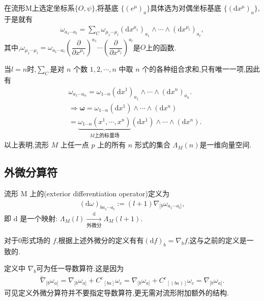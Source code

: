 在流形M上选定坐标系$\{O,\psi\}$,将基底 $\{(e^\mu)_a\}$具体选为对偶坐标基底 $\{(\mathrm{d}x^\mu)_a\}$,于是就有
\begin{align}
\displaystyle\omega_{a_1\cdots a_l}=\sum\limits_C\omega_{\mu_1\cdots\mu_l}
(\text{d}x^{\mu_1})_{a_1}\wedge\cdots\wedge(\text{d}x^{\mu_l})_{a_l},
\end{align}
其中,$\omega_{\mu_1\cdots\mu_l}=\omega_{a_1\cdots a_l}\left(\dfrac{\partial}{\partial x^{\mu_1}}\right)^{a_1}\cdots\left(\dfrac{\partial}{\partial x^{\mu_l}}\right)^{a_l}$是$O$上的函数.
\begin{remark}
当$l=n$时,$\sum\limits_C$是对 $n$ 个数 $1,2,\cdots,n$ 中取 $n$ 个的各种组合求和,只有唯一一项,因此有
$$
\begin{aligned}
&\omega_{a_1\cdots a_n}=\omega_{1\cdots n}(\text{d}x^{1})_{a_1}\wedge\cdots\wedge(\text{d}x^{n})_{a_n}.\\
&\Rightarrow \boldsymbol{\omega}=\omega_{1\cdots n}(\text{d}x^{1})\wedge\cdots\wedge(\text{d}x^{n})\\
&=\underset{M\text{上的标量场}}{\underbrace{\omega_{1\cdots n}(x^1,\cdots,x^n)}}(\text{d}x^{1})\wedge\cdots\wedge(\text{d}x^{n}).
\end{aligned}$$
以上表明,流形 $M$ 上任一点 $p$ 上的所有 $n$ 形式的集合 $\Lambda_M(n)$是一维向量空间.
\end{remark}
\subsection{外微分算符}

流形 M 上的(exterior differentiation operator)定义为
\begin{align}
(\mathrm{d}\omega)_{ba_1\cdots a_l}:=(l+1)\nabla_{[b}\omega_{a_1\cdots a_l]},
\end{align}
即 $\mathrm{d}$ 是一个映射:
$\Lambda_M(l)\xrightarrow [\text{外微分}]{\mathrm{d}} \Lambda_M(l+1)$.

对于0形式场的 $f$,根据上述外微分的定义有有$(\mathrm{d}f)_b=\nabla_bf$,这与之前的定义是一致的.
\begin{remark}
定义中 $\nabla_b$可为任一导数算符.这是因为
$$
\begin{aligned}
\tilde{\nabla}_{[b}\omega_{a]}=\nabla_{[b}\omega_{a]}+C^c{}_{[ba]}\omega_c=\nabla_{[b}\omega_{a]}+C^c{}_{[(ba)]}\omega_c=\nabla_{[b}\omega_{a]}.
\end{aligned}
$$
可见定义外微分算符并不要指定导数算符,更无需对流形附加额外的结构.
\end{remark}


